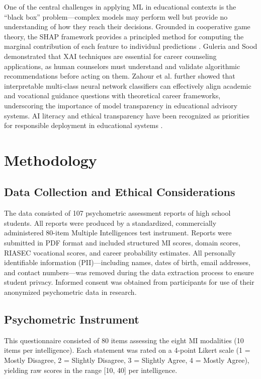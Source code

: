 \documentclass[12pt, a4paper]{article}
\begin{document}
One of the central challenges in applying ML in educational contexts is the ``black box'' problem---complex models may perform well but provide no understanding of how they reach their decisions. Grounded in cooperative game theory, the SHAP framework provides a principled method for computing the marginal contribution of each feature to individual predictions \cite{lundberg2017unified}. Guleria and Sood \citeyear{guleria2022explainable} demonstrated that XAI techniques are essential for career counseling applications, as human counselors must understand and validate algorithmic recommendations before acting on them. Zahour et al. \citeyear{zahour2019automatic} further showed that interpretable multi-class neural network classifiers can effectively align academic and vocational guidance questions with theoretical career frameworks, underscoring the importance of model transparency in educational advisory systems. AI literacy and ethical transparency have been recognized as priorities for responsible deployment in educational systems \cite{zhang2022integrating}.

\section{Methodology}

\subsection{Data Collection and Ethical Considerations}

The data consisted of 107 psychometric assessment reports of high school students. All reports were produced by a standardized, commercially administered 80-item Multiple Intelligences test instrument. Reports were submitted in PDF format and included structured MI scores, domain scores, RIASEC vocational scores, and career probability estimates. All personally identifiable information (PII)---including names, dates of birth, email addresses, and contact numbers---was removed during the data extraction process to ensure student privacy. Informed consent was obtained from participants for use of their anonymized psychometric data in research.

\subsection{Psychometric Instrument}

This questionnaire consisted of 80 items assessing the eight MI modalities (10 items per intelligence). Each statement was rated on a 4-point Likert scale (1 = Mostly Disagree, 2 = Slightly Disagree, 3 = Slightly Agree, 4 = Mostly Agree), yielding raw scores in the range [10, 40] per intelligence.
\end{document}
